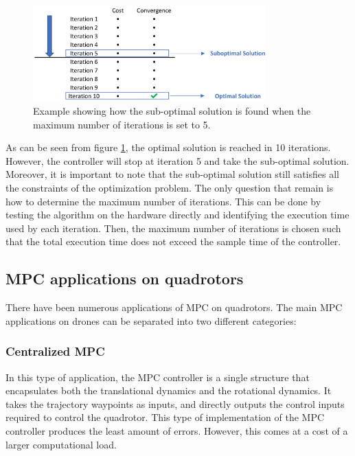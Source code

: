 \documentclass{thesisreport}
\begin{document}
\begin{figure}[h]
\centering
\includegraphics[width=0.8\textwidth]{Images/Control/Suboptimal_Solution.png}
\caption{Example showing how the sub-optimal solution is found when the maximum number of iterations is set to 5.}
\label{Suboptimal_solution_example}
\end{figure}

\noindent As can be seen from figure \ref{Suboptimal_solution_example}, the optimal solution is reached in 10 iterations. However, the controller will stop at iteration 5 and take the sub-optimal solution. Moreover, it is important to note that the sub-optimal solution still satisfies all the constraints of the optimization problem. The only question that remain is how to determine the maximum number of iterations. This can be done by testing the algorithm on the hardware directly and identifying the execution time used by each iteration. Then, the maximum number of iterations is chosen such that the total execution time does not exceed the sample time of the controller.

\subsection{MPC applications on quadrotors}

 There have been numerous applications of MPC on quadrotors. The main MPC applications on drones can be separated into two different categories:

\subsubsection{Centralized MPC}
 
In this type of application, the MPC controller is a single structure that encapsulates both the translational dynamics and the rotational dynamics. It takes the trajectory waypoints as inputs, and directly outputs the control inputs required to control the quadrotor. This type of implementation of the MPC controller produces the least amount of errors. However, this comes at a cost of a larger computational load.
\end{document}
